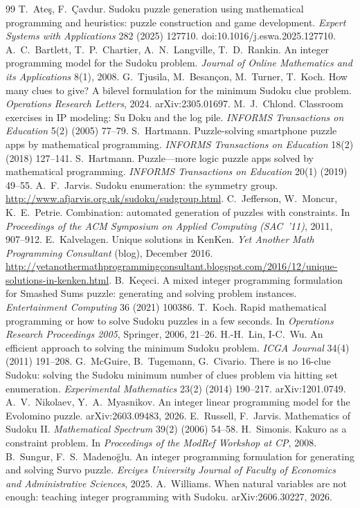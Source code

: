 \documentclass[11pt]{article}
\begin{document}
\begin{thebibliography}{99}
 T.~Ate\c{s}, F.~\c{C}avdur. Sudoku puzzle generation using mathematical programming and heuristics: puzzle construction and game development. \emph{Expert Systems with Applications} 282 (2025) 127710. doi:10.1016/j.eswa.2025.127710.
 A.~C.~Bartlett, T.~P.~Chartier, A.~N.~Langville, T.~D.~Rankin. An integer programming model for the Sudoku problem. \emph{Journal of Online Mathematics and its Applications} 8(1), 2008.
 G.~Tjusila, M.~Besan\c{c}on, M.~Turner, T.~Koch. How many clues to give? A bilevel formulation for the minimum Sudoku clue problem. \emph{Operations Research Letters}, 2024. arXiv:2305.01697.
 M.~J.~Chlond. Classroom exercises in IP modeling: Su Doku and the log pile. \emph{INFORMS Transactions on Education} 5(2) (2005) 77--79.
 S.~Hartmann. Puzzle-solving smartphone puzzle apps by mathematical programming. \emph{INFORMS Transactions on Education} 18(2) (2018) 127--141.
 S.~Hartmann. Puzzle---more logic puzzle apps solved by mathematical programming. \emph{INFORMS Transactions on Education} 20(1) (2019) 49--55.
 A.~F.~Jarvis. Sudoku enumeration: the symmetry group. \url{http://www.afjarvis.org.uk/sudoku/sudgroup.html}.
 C.~Jefferson, W.~Moncur, K.~E.~Petrie. Combination: automated generation of puzzles with constraints. In \emph{Proceedings of the ACM Symposium on Applied Computing (SAC~'11)}, 2011, 907--912.
 E.~Kalvelagen. Unique solutions in KenKen. \emph{Yet Another Math Programming Consultant} (blog), December 2016. \url{http://yetanothermathprogrammingconsultant.blogspot.com/2016/12/unique-solutions-in-kenken.html}.
 B.~Ke\c{c}eci. A mixed integer programming formulation for Smashed Sums puzzle: generating and solving problem instances. \emph{Entertainment Computing} 36 (2021) 100386.
 T.~Koch. Rapid mathematical programming or how to solve Sudoku puzzles in a few seconds. In \emph{Operations Research Proceedings 2005}, Springer, 2006, 21--26.
 H.-H.~Lin, I-C.~Wu. An efficient approach to solving the minimum Sudoku problem. \emph{ICGA Journal} 34(4) (2011) 191--208.
 G.~McGuire, B.~Tugemann, G.~Civario. There is no 16-clue Sudoku: solving the Sudoku minimum number of clues problem via hitting set enumeration. \emph{Experimental Mathematics} 23(2) (2014) 190--217. arXiv:1201.0749.
 A.~V.~Nikolaev, Y.~A.~Myasnikov. An integer linear programming model for the Evolomino puzzle. arXiv:2603.09483, 2026.
 E.~Russell, F.~Jarvis. Mathematics of Sudoku II. \emph{Mathematical Spectrum} 39(2) (2006) 54--58.
 H.~Simonis. Kakuro as a constraint problem. In \emph{Proceedings of the ModRef Workshop at CP}, 2008.
 B.~Sungur, F.~S.~Madeno\u{g}lu. An integer programming formulation for generating and solving Survo puzzle. \emph{Erciyes University Journal of Faculty of Economics and Administrative Sciences}, 2025.
 A.~Williams. When natural variables are not enough: teaching integer programming with Sudoku. arXiv:2606.30227, 2026.
\end{thebibliography}
\end{document}
